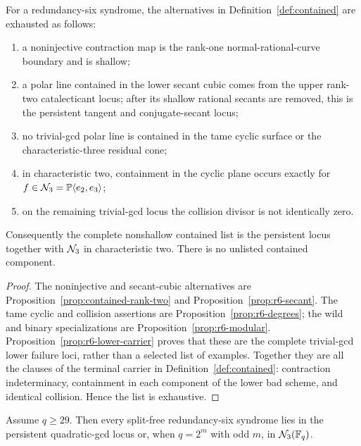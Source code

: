 \pagebreak[3]
\begin{proposition}
\label{prop:r6-contained}%
%
For a redundancy-six syndrome, the alternatives in
Definition~\ref{def:contained} are exhausted as follows:
\begin{enumerate}[label=\textup{(\roman*)}]
\item a noninjective contraction map is the rank-one
      normal-rational-curve boundary and is shallow;
\item a polar line contained in the lower secant cubic comes from the
      upper rank-two catalecticant locus; after its shallow rational
      secants are removed, this is the persistent tangent and
      conjugate-secant locus;
\item no trivial-gcd polar line is contained in the tame cyclic
      surface or the characteristic-three residual cone;
\item in characteristic two, containment in the cyclic plane occurs
      exactly for \(f\in\mathcal N_3=\mathbb P\langle e_2,e_3\rangle\);
\item on the remaining trivial-gcd locus the collision divisor
      is not identically zero.
\end{enumerate}
Consequently the complete nonshallow contained list is the persistent
locus together with \(\mathcal N_3\) in characteristic two.  There is no
unlisted contained component.
\end{proposition}

\begin{proof}
The noninjective and secant-cubic alternatives are
Proposition~\ref{prop:contained-rank-two} and
Proposition~\ref{prop:r6-secant}.  The tame cyclic and collision
assertions are Proposition~\ref{prop:r6-degrees}; the wild and binary
specializations are Proposition~\ref{prop:r6-modular}.
Proposition~\ref{prop:r6-lower-carrier} proves that these are the
complete trivial-gcd lower failure loci, rather than a selected list
of examples.  Together they are all the clauses of the terminal carrier in
Definition~\ref{def:contained}: contraction
indeterminacy, containment in each component of the lower bad scheme,
and identical collision.  Hence the list is exhaustive.
\end{proof}

\begin{proposition}\label{prop:r6-one-step}%
%
%
Assume \(q\geq29\).
Then every split-free redundancy-six syndrome lies in the persistent
quadratic-gcd locus or, when \(q=2^m\) with odd \(m\), in
\(\mathcal N_3(\mathbb F_q)\).
\end{proposition}

